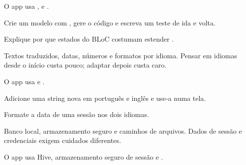 \begin{noproduto}
O app usa ,  e .
\end{noproduto}

\begin{paraestudar}
  \item {}
  \item {}
\end{paraestudar}

\begin{pratique}
  \item Crie um modelo com , gere o código e escreva um teste de ida e volta.
  \item Explique por que estados do BLoC costumam estender .
\end{pratique}

Textos traduzidos, datas, números e formatos por idioma. Pensar em idiomas desde o início custa pouco; adaptar depois custa caro.

\begin{noproduto}
O app usa  e .
\end{noproduto}

\begin{paraestudar}
  \item {}
  \item {}
\end{paraestudar}

\begin{pratique}
  \item Adicione uma string nova em português e inglês e use-a numa tela.
  \item Formate a data de uma sessão nos dois idiomas.
\end{pratique}

Banco local, armazenamento seguro e caminhos de arquivos. Dados de sessão e credenciais exigem cuidados diferentes.

\begin{noproduto}
O app usa Hive, armazenamento seguro de sessão e .
\end{noproduto}

\begin{paraestudar}
  \item {}
  \item {}
\end{paraestudar}

